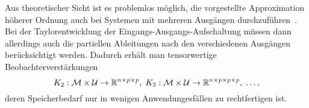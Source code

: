 \medskip{}

\begin{remark}
Aus theoretischer Sicht ist es problemlos möglich, die vorgestellte
Approximation höherer Ordnung auch bei Systemen mit mehreren Ausgängen
durchzuführen~\cite{roebenack2005ifac}. Bei der Taylorentwicklung
der Eingangs-Ausgangs-Aufschaltung müssen dann allerdings auch die
partiellen Ableitungen nach den verschiedenen Ausgängen berücksichtigt
werden. Dadurch erhält man tensorwertige Beobachterverstärkungen
\[
K_{2}:\mathcal{M}\times\mathcal{U}\to{\mathbb{R}}^{n\times p\times p},\;K_{3}:\mathcal{M}\times\mathcal{U}\to{\mathbb{R}}^{n\times p\times p\times p},\;\ldots,
\]
deren Speicherbedarf nur in wenigen Anwendungesfällen zu rechtfertigen
ist.
\end{remark}

\nocite{nijmeijer99,Corliss2001}

\nocite{jakubczyk85}
\nocite{meurer2005syncod}




